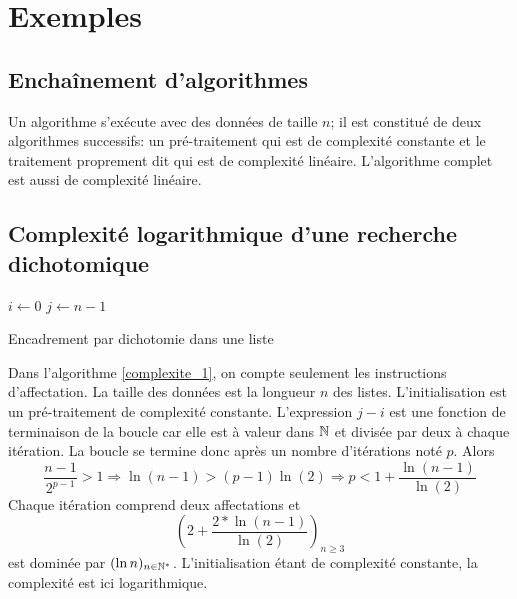 \section{Exemples}
\subsection{Enchaînement d'algorithmes}
Un algorithme s'exécute avec des données de taille $n$; il est constitué de deux algorithmes successifs: un pré-traitement qui est de complexité constante et le traitement proprement dit qui est de complexité linéaire. L'algorithme complet est aussi de complexité linéaire.

\subsection{Complexité logarithmique d'une recherche dichotomique}
\begin{algorithm}
  $i\leftarrow 0$\;
  $j\leftarrow n-1$\;
  \caption{Encadrement par dichotomie dans une liste}
  \label{complexite_1}
\end{algorithm}
Dans l'algorithme \ref{complexite_1}, on compte seulement les instructions d'affectation. La taille des données est la longueur $n$ des listes.\newline
L'initialisation est un pré-traitement de complexité constante.\newline
L'expression $j-i$ est une fonction de terminaison de la boucle car elle est à valeur dans $\mathbb{N}$ et divisée par deux à chaque itération. La boucle se termine donc après un nombre d'itérations noté $p$. Alors
\begin{displaymath}
  \frac{n-1}{2^{p-1}} > 1
\Rightarrow \ln(n-1) > (p-1) \ln(2)  
\Rightarrow p < 1 + \frac{\ln(n-1)}{\ln(2)}
\end{displaymath}
Chaque itération comprend deux affectations et 
\begin{displaymath}
  \left( 2 + \frac{2*\ln(n-1)}{\ln(2)}\right)_{n\geq 3} 
\end{displaymath}
est dominée par $(\ln n)_{n\in \mathbb{N}^*}$. L'initialisation étant de complexité constante, la complexité est ici logarithmique.

